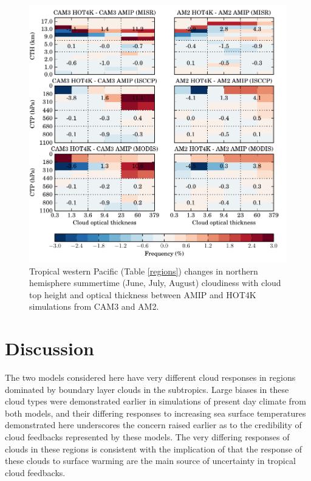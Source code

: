 \begin{figure}
    \centering
    \includegraphics{../graphics/hist2d_cmip3hot4k_twp.pdf}
    \caption[Tropical western Pacific changes in northern hemisphere summertime cloudiness with cloud top height and optical thickness between AMIP and HOT4K simulations from CAM3 and AM2.]{Tropical western Pacific (Table \ref{regions}) changes in northern hemisphere summertime (June, July, August) cloudiness with cloud top height and optical thickness between AMIP and HOT4K simulations from CAM3 and AM2.}
    \label{hist2d_cmip3hot4k_twp}
\end{figure}

\section{Discussion}
The two models considered here have very different cloud responses in regions dominated by boundary layer clouds in the subtropics. Large biases in these cloud types were demonstrated earlier in simulations of present day climate from both models, and their differing responses to increasing sea surface temperatures demonstrated here underscores the concern raised earlier as to the credibility of cloud feedbacks represented by these models. The very differing responses of clouds in these regions is consistent with the implication of \cite{bony_and_dufresne_2005} that the response of these clouds to surface warming are the main source of uncertainty in tropical cloud feedbacks.

